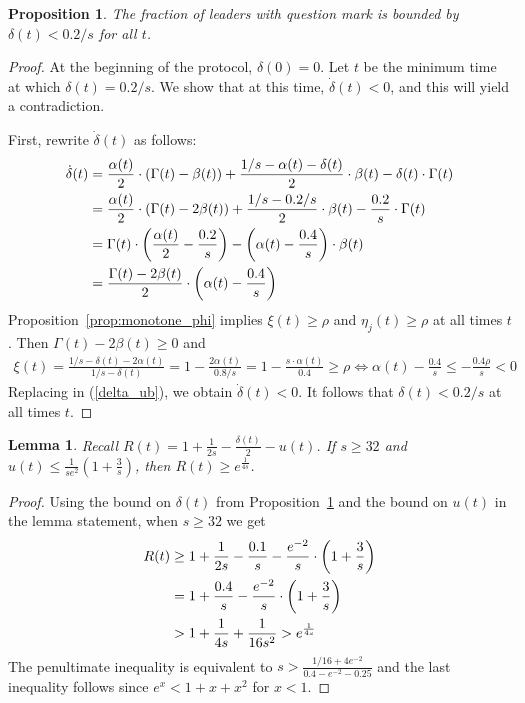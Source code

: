 \documentclass[a4paper,12pt]{article}
\newtheorem{proposition}{Proposition}
\newtheorem{lemma}{Lemma}
\begin{document}
\begin{proposition} \label{ub:delta}
The fraction of leaders with question mark is bounded by
$\delta(t) < 0.2/s$ for all $t$.
\end{proposition}
\begin{proof}
At the beginning of the protocol, $\delta(0) = 0$. Let $t$ be the minimum time at which $\delta(t) = 0.2/s$. We show that at this time, $\dot{\delta}(t) < 0$, and this will yield a contradiction.

First, rewrite $\dot{\delta}(t)$ as follows:
\begin{align} \label{delta_ub}
\dot{\delta}(t) & = \frac{\alpha(t)}{2} \cdot \left(\Gamma(t) - \beta(t) \right) + \frac{1/s - \alpha(t) - \delta(t)}{2} \cdot \beta(t) - \delta(t) \cdot \Gamma(t) \notag \\
& = \frac{\alpha(t)}{2} \cdot \left(\Gamma(t) - 2\beta(t) \right) + \frac{1/s - 0.2/s}{2} \cdot \beta(t) - \frac{0.2}{s} \cdot \Gamma(t) \notag \\
& = \Gamma(t) \cdot \left(\frac{\alpha(t)}{2} - \frac{0.2}{s}\right) - \left(\alpha(t) - \frac{0.4}{s}\right) \cdot \beta(t) \notag \\
& = \frac{\Gamma(t)- 2 \beta(t)}{2} \cdot \left(\alpha(t) - \frac{0.4}{s} \right)
\end{align}
Proposition~\ref{prop:monotone_phi} implies $\xi(t) \geq \rho$ and $\eta_j(t) \geq \rho$ at all times $t$. Then $\Gamma(t) - 2\beta(t) \geq 0$ and
\begin{align}
\xi(t) = \frac{1/s - \delta(t) - 2 \alpha(t)}{1/s - \delta(t)} = 1 -  \frac{2 \alpha(t)}{0.8/s} = 1 - \frac{s \cdot \alpha(t)}{0.4} \geq \rho \iff \alpha(t) - \frac{0.4}{s} \leq - \frac{0.4 \rho}{s} < 0
\end{align}
Replacing in (\ref{delta_ub}), we obtain $\dot{\delta}(t) < 0$. It follows that $\delta(t) < 0.2/s$ at all times $t$.
\end{proof}

\begin{lemma} \label{lem:R_lb}
Recall $R(t) = 1 + \frac{1}{2s} - \frac{\delta(t)}{2} - u(t)$.
If $s \geq 32$ and $u(t) \leq \frac{1}{se^2} \left(1 + \frac{3}{s}\right)$, then $R(t) \geq e^{\frac{1}{4s}}$.
\end{lemma}
\begin{proof}
Using the bound on $\delta(t)$ from Proposition~\ref{ub:delta} and the bound on $u(t)$ in the lemma statement, when $s \geq 32$ we get
\begin{align} %
R(t) & \geq 1 + \frac{1}{2s} - \frac{0.1}{s} - \frac{e^{-2}}{s} \cdot \left( 1 + \frac{3}{s} \right) \notag \\
& = 1 + \frac{0.4}{s} - \frac{e^{-2}}{s} \cdot \left(1 + \frac{3}{s} \right) \notag \\
& > 1 + \frac{1}{4s} + \frac{1}{16s^2} > e^{\frac{1}{4s}} \notag
\end{align}
The penultimate inequality is equivalent to $s > \frac{1/16 + 4 e^{-2}}{0.4 - e^{-2} - 0.25}$ and the last inequality follows since $e^x < 1 + x + x^2$ for $x < 1$.
\end{proof}
\end{document}
